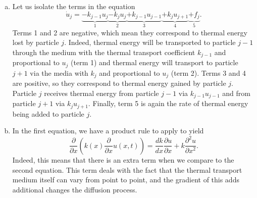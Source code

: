 \documentclass[12pt]{article} %
\begin{document}
\begin{solution}
\begin{enumerate}[(a)]
    \item Let us isolate the terms in the equation
\[
\dot{u}_j = \underbrace{-k_{j-1}u_j}_1 \underbrace{- k_{j} u_j}_2 \underbrace{+ k_{j-1}u_{j-1}}_3 \underbrace{+ k_{j} u_{j+1}}_4 \underbrace{+ f_j}_5.
\]
Terms 1 and 2 are negative, which mean they correspond to thermal energy lost by particle $j$. Indeed, thermal energy will be transported to particle $j-1$ through the medium with the thermal transport coefficient $k_{j-1}$ and proportional to $u_{j}$ (term 1) and thermal energy will transport to particle $j+1$ via the media with $k_j$ and proportional to $u_j$ (term 2). Terms 3 and 4 are positive, so they correspond to thermal energy gained by particle $j$. Particle $j$ receives thermal energy from particle $j-1$ via $k_{j-1}u_{j-1}$ and from particle $j+1$ via $k_j u_{j+1}$. Finally, term 5 is again the rate of thermal energy being added to particle $j$.

\item In the first equation, we have a product rule to apply to yield
\[
\frac{\partial}{\partial x} \left( k(x)\frac{\partial}{\partial x} u(x,t) \right) = \frac{d k}{dx} \frac{\partial u}{\partial x} + k \frac{\partial^2 u}{\partial x^2}.
\]
Indeed, this means that there is an extra term when we compare to the second equation. This term deals with the fact that the thermal transport medium itself can vary from point to point, and the gradient of this adds additional changes the diffusion process.
\end{enumerate}
\end{solution}

\newpage
\end{document}
